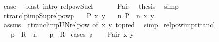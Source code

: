 \begin{isabellebody}
\ {\isacharquery}{\kern0pt}case\ \isamarkupfalse%
\ {\isacharparenleft}{\kern0pt}blast\ intro{\isacharcolon}{\kern0pt}\ relpow{\isacharunderscore}{\kern0pt}Suc{\isacharunderscore}{\kern0pt}I{\isacharparenright}{\kern0pt}\isanewline
\ \ \isamarkupfalse%
\isanewline
\ \ \isamarkupfalse%
\ Pair\ \isamarkupfalse%
\ {\isacharquery}{\kern0pt}thesis\ \isamarkupfalse%
\ simp\isanewline
{}\isamarkupfalse%
%
\endisatagproof
{\isafoldproof}%
%
\isadelimproof
\isanewline
%
\endisadelimproof
\isanewline
{}\isamarkupfalse%
\ rtranclp{\isacharunderscore}{\kern0pt}imp{\isacharunderscore}{\kern0pt}Sup{\isacharunderscore}{\kern0pt}relpowp{\isacharcolon}{\kern0pt}\isanewline
\ \ \ {\isachardoublequoteopen}{\isacharparenleft}{\kern0pt}P\isactrlsup {\isacharasterisk}{\kern0pt}\isactrlsup {\isacharasterisk}{\kern0pt}{\isacharparenright}{\kern0pt}\ x\ y{\isachardoublequoteclose}\isanewline
\ \ \ {\isachardoublequoteopen}{\isacharparenleft}{\kern0pt}{\isasymSqunion}n{\isachardot}{\kern0pt}\ P\ {\isacharcircum}{\kern0pt}{\isacharcircum}{\kern0pt}\ n{\isacharparenright}{\kern0pt}\ x\ y{\isachardoublequoteclose}\isanewline
%
\isadelimproof
\ \ %
\endisadelimproof
%
\isatagproof
{}\isamarkupfalse%
\ assms\ \ rtrancl{\isacharunderscore}{\kern0pt}imp{\isacharunderscore}{\kern0pt}UN{\isacharunderscore}{\kern0pt}relpow\ {\isacharbrackleft}{\kern0pt}of\ {\isachardoublequoteopen}{\isacharparenleft}{\kern0pt}x{\isacharcomma}{\kern0pt}\ y{\isacharparenright}{\kern0pt}{\isachardoublequoteclose}{\isacharcomma}{\kern0pt}\ to{\isacharunderscore}{\kern0pt}pred{\isacharbrackright}{\kern0pt}\ \isamarkupfalse%
\ simp%
\endisatagproof
{\isafoldproof}%
%
\isadelimproof
\isanewline
%
\endisadelimproof
\isanewline
{}\isamarkupfalse%
\ relpow{\isacharunderscore}{\kern0pt}imp{\isacharunderscore}{\kern0pt}rtrancl{\isacharcolon}{\kern0pt}\isanewline
\ \ \ {\isachardoublequoteopen}p\ {\isasymin}\ R\ {\isacharcircum}{\kern0pt}{\isacharcircum}{\kern0pt}\ n{\isachardoublequoteclose}\isanewline
\ \ \ {\isachardoublequoteopen}p\ {\isasymin}\ R\isactrlsup {\isacharasterisk}{\kern0pt}{\isachardoublequoteclose}\isanewline
%
\isadelimproof
%
\endisadelimproof
%
\isatagproof
{}\isamarkupfalse%
\ {\isacharparenleft}{\kern0pt}cases\ p{\isacharparenright}{\kern0pt}\isanewline
\ \ \isamarkupfalse%
\ {\isacharparenleft}{\kern0pt}Pair\ x\ y{\isacharparenright}{\kern0pt}\isanewline

\end{isabellebody}
